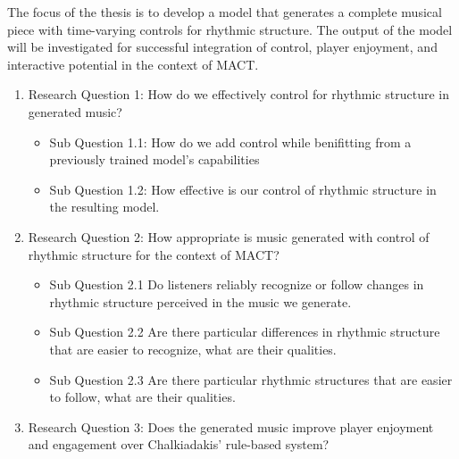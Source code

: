 The focus of the thesis is to develop a model that generates a complete musical piece with time-varying controls for rhythmic structure. The output of the model will be investigated for successful integration of control, player enjoyment, and interactive potential in the context of MACT. 
  
\begin{enumerate}
\item{Research Question 1}: How do we effectively control for rhythmic structure in generated music?
\begin{itemize}
\item{Sub Question 1.1}: How do we add control while benifitting from a previously trained model's capabilities
\item{Sub Question 1.2}: How effective is our control of rhythmic structure in the resulting model.
\end{itemize}
\item{Research Question 2}: How appropriate is music generated with control of rhythmic structure for the context of MACT?
\begin{itemize}
\item{Sub Question 2.1} Do listeners reliably recognize or follow changes in rhythmic structure perceived in the music we generate.
\item{Sub Question 2.2} Are there particular differences in rhythmic structure that are easier to recognize, what are their qualities.
\item{Sub Question 2.3} Are there particular rhythmic structures that are easier to follow, what are their qualities. 
\end{itemize}
\item {Research Question 3}: Does the generated music improve player enjoyment and engagement over Chalkiadakis' \cite{Chalkiadakis_2022} rule-based system? 
\end{enumerate}
